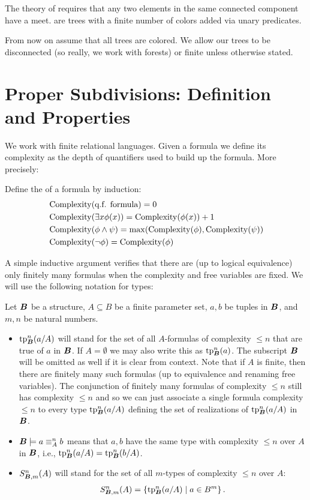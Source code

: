 The theory of  requires that any two elements in the same connected component have a meet.  are trees with a finite number of colors added via unary predicates.

From now on assume that all trees are colored.
We allow our trees to be disconnected (so really, we work with forests) or finite unless otherwise stated.

\section{Proper Subdivisions: Definition and Properties}
We work with finite relational languages.
Given a formula we define its complexity as the depth of quantifiers used to build up the formula. More precisely:
\begin{Definition}
  Define the  of a formula by induction:
  \begin{align*}
    &\operatorname{Complexity}(\text{q.f. formula}) = 0 \\
    &\operatorname{Complexity}(\exists x \phi(x)) = \operatorname{Complexity}(\phi(x)) + 1 \\
    &\operatorname{Complexity}(\phi \wedge \psi) = \max(\operatorname{Complexity}(\phi), \operatorname{Complexity}(\psi)) \\
    &\operatorname{Complexity}(\neg \phi) = \operatorname{Complexity}(\phi)
  \end{align*}
\end{Definition}
A simple inductive argument verifies that there are (up to logical equivalence) only finitely many formulas when the complexity
and free variables are fixed.
We will use the following notation for types:
\begin{Definition} Let $\operatorname{\boldsymbol B}$ be a structure, $A \subseteq B$ be a finite parameter set, $a,b$ be tuples in $\operatorname{\boldsymbol B}$, and $m, n$ be natural numbers.
  \begin{itemize}
  \item $\operatorname{tp}^n_{\operatorname{\boldsymbol B}}(a/A)$ will stand for the set of all $A$-formulas of complexity $\leq n$ that are true of $a$ in $\operatorname{\boldsymbol B}$.
    If $A = \emptyset$ we may also write this as $\operatorname{tp}^n_{\operatorname{\boldsymbol B}}(a)$.
    The subscript $\operatorname{\boldsymbol B}$ will be omitted as well if it is clear from context.
    Note that if $A$ is finite, then there are finitely many such formulas (up to equivalence and renaming free variables).
    The conjunction of finitely many formulas of complexity $\leq n$
    still has complexity $\leq n$ and so we can just associate a single formula complexity $\leq n$ to every type $\operatorname{tp}^n_{\operatorname{\boldsymbol B}}(a/A)$
    defining the set of realizations of $\operatorname{tp}^n_{\operatorname{\boldsymbol B}}(a/A)$ in $\operatorname{\boldsymbol B}$.
  \item $\operatorname{\boldsymbol B} \models a \equiv^n_A b$ means that $a,b$ have the same type with complexity $\leq n$ over $A$ in $\operatorname{\boldsymbol B}$, i.e., $\operatorname{tp}^n_{\operatorname{\boldsymbol B}}(a/A) = \operatorname{tp}^n_{\operatorname{\boldsymbol B}}(b/A)$.
  \item $S^n_{\operatorname{\boldsymbol B}, m}(A)$ will stand for the set of all $m$-types of complexity $\leq n$ over $A$:
    \begin{align*}
      S^n_{\operatorname{\boldsymbol B}, m}(A) = \left\{\operatorname{tp}^n_{\operatorname{\boldsymbol B}}(a/A) \mid a \in B^m\right\}.
    \end{align*}
  \end{itemize}
\end{Definition}

